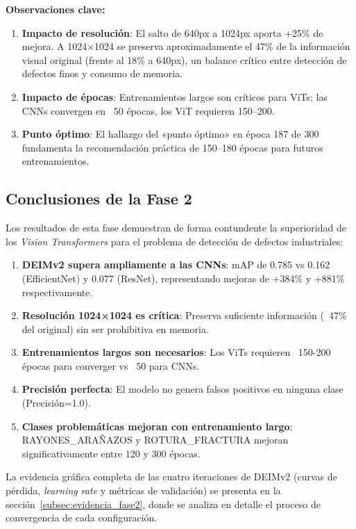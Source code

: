 \textbf{Observaciones clave:}
\begin{enumerate}
    \item \textbf{Impacto de resolución}: El salto de 640px a 1024px aporta +25\% de mejora. A 1024×1024 se preserva aproximadamente el 47\% de la información visual original (frente al 18\% a 640px), un balance crítico entre detección de defectos finos y consumo de memoria.
    \item \textbf{Impacto de épocas}: Entrenamientos largos son críticos para ViTs; las CNNs convergen en ~50 épocas, los ViT requieren 150--200.
    \item \textbf{Punto óptimo}: El hallazgo del «punto óptimo» en época 187 de 300 fundamenta la recomendación práctica de 150--180 épocas para futuros entrenamientos.
\end{enumerate}

\subsection{Conclusiones de la Fase 2}

Los resultados de esta fase demuestran de forma contundente la superioridad de los \textit{Vision Transformers} para el problema de detección de defectos industriales:

\begin{enumerate}
    \item \textbf{DEIMv2 supera ampliamente a las CNNs}: mAP de 0.785 vs 0.162 (EfficientNet) y 0.077 (ResNet), representando mejoras de +384\% y +881\% respectivamente.
    \item \textbf{Resolución 1024×1024 es crítica}: Preserva suficiente información (~47\% del original) sin ser prohibitiva en memoria.
    \item \textbf{Entrenamientos largos son necesarios}: Los ViTs requieren ~150-200 épocas para converger vs ~50 para CNNs.
    \item \textbf{Precisión perfecta}: El modelo no genera falsos positivos en ninguna clase (Precisión=1.0).
    \item \textbf{Clases problemáticas mejoran con entrenamiento largo}: \mbox{RAYONES\_ARAÑAZOS} y \mbox{ROTURA\_FRACTURA} mejoran significativamente entre 120 y 300 épocas.
\end{enumerate}

La evidencia gráfica completa de las cuatro iteraciones de DEIMv2 (curvas de pérdida, \textit{learning rate} y métricas de validación) se presenta en la sección~\ref{subsec:evidencia_fase2}, donde se analiza en detalle el proceso de convergencia de cada configuración.

